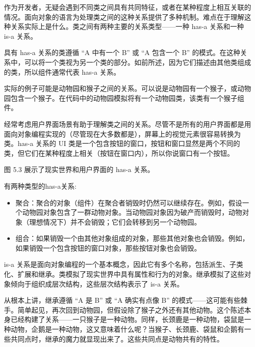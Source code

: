 
作为开发者，无疑会遇到不同类之间具有共同特征，或者在某种程度上相互关联的情况。面向对象的语言为处理类之间的这种关系提供了多种机制。难点在于理解这种关系实际上是什么。类之间有两种主要的关系类型——一种 has-a 关系和一种 is-a 关系。


具有 has-a 关系的类遵循 “A 中有一个 B” 或 “A 包含一个 B” 的模式。在这种关系中，可以将一个类视为另一个类的部分。如前所述，因为它们描述由其他类组成的类，所以组件通常代表 has-a 关系。

实际的例子可能是动物园和猴子之间的关系。可以说是动物园有一个猴子，或动物园包含一个猴子。在代码中的动物园模拟将有一个动物园类，该类有一个猴子组件。

经常考虑用户界面场景有助于理解类之间的关系。尽管不是所有的用户界面都是用面向对象编程实现的（尽管现在大多数都是），屏幕上的视觉元素很容易转换为类。has-a 关系的 UI 类是一个包含按钮的窗口，按钮和窗口显然是两个不同的类，但它们在某种程度上相关（按钮在窗口内），所以你说窗口有一个按钮。

图 5.3 展示了现实世界和用户界面的 has-a 关系。


有两种类型的has-a关系:

\begin{itemize}
\item
聚合：聚合的对象（组件）在聚合者销毁时仍然可以继续存在。例如，假设一个动物园对象包含了一群动物对象。当动物园对象因为破产而销毁时，动物对象（理想情况下）并不会销毁；它们会转移到另一个动物园。

\item
组合：如果销毁一个由其他对象组成的对象，那些其他对象也会销毁。例如，如果销毁一个包含按钮的窗口对象，那些按钮对象也会销毁。
\end{itemize}


is-a 关系是面向对象编程的一个基本概念，因此它有多个名称，包括派生、子类化、扩展和继承。类模拟了现实世界中具有属性和行为的对象。继承模拟了这些对象倾向于组织成层次结构，这些层次结构表示了 is-a 关系。

从根本上讲，继承遵循 “A 是 B” 或 “A 确实有点像 B” 的模式——这可能有些棘手。简单起见，再次回到动物园，但假设除了猴子之外还有其他动物。这个陈述本身已经构建了关系——一只猴子是一种动物。同样，长颈鹿是一种动物，袋鼠是一种动物，企鹅是一种动物，这又意味着什么呢？当猴子、长颈鹿、袋鼠和企鹅有一些共同点时，继承的魔力就显现出来了。这些共同点是动物共有的特性。

